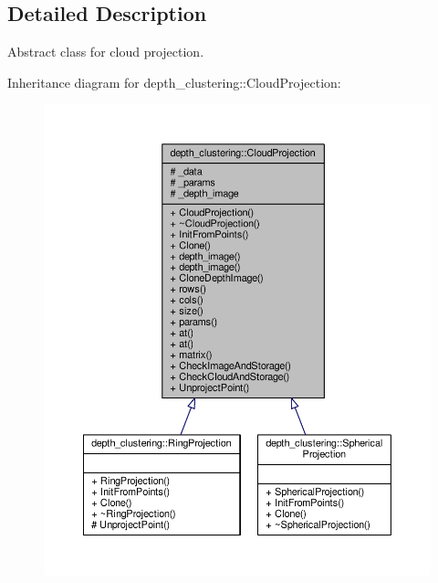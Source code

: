 \subsection{Detailed Description}
Abstract class for cloud projection. 

Inheritance diagram for depth\-\_\-clustering\-:\-:Cloud\-Projection\-:
\nopagebreak
\begin{figure}[H]
\begin{center}
\leavevmode
\includegraphics[width=350pt]{classdepth__clustering_1_1CloudProjection__inherit__graph}
\end{center}
\end{figure}



